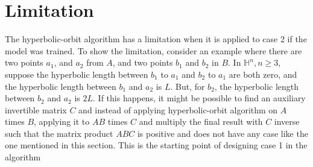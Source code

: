 \documentclass{article}
\theoremstyle{plain}
\theoremstyle{plain} %
\theoremstyle{definition}  %
\theoremstyle{remark}  %
\theoremstyle{plain}
\begin{document}
\section{Limitation}
The hyperbolic-orbit algorithm has a limitation when it is applied to case 2 if the model was trained. To show the limitation, consider an example where there are two points $a_1$, and $a_2$ from $A$, and two points $b_1$ and $b_2$ in $B$. In $\mathbb{H}^n, n\geq 3$, suppose the hyperbolic length between $b_1$ to $a_1$ and $b_2$ to $a_1$ are both zero, and the hyperbolic length between $b_1$ and $a_2$ is $L$. But, for $b_2$, the hyperbolic length between $b_2$ and $a_2$ is $2L$. If this happens, it might be possible to find an auxiliary invertible matrix $C$ and instead of applying hyperbolic-orbit algorithm on $A$ times $B$, applying it to $AB$ times $C$ and multiply the final result with $C$ inverse such that the matrix product $ABC$ is positive and does not have any case like the one mentioned in this section. This is the starting point of designing case 1 in the algorithm





\end{document}
